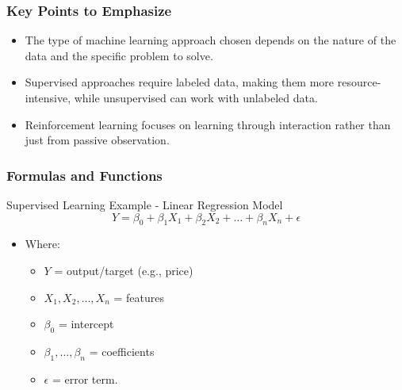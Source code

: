 \documentclass{beamer}
\begin{document}
\begin{frame}[fragile]
    \frametitle{Key Points to Emphasize}
    \begin{itemize}
        \item The type of machine learning approach chosen depends on the nature of the data and the specific problem to solve.
        \item Supervised approaches require labeled data, making them more resource-intensive, while unsupervised can work with unlabeled data.
        \item Reinforcement learning focuses on learning through interaction rather than just from passive observation.
    \end{itemize}
\end{frame}

\begin{frame}[fragile]
    \frametitle{Formulas and Functions}
    \begin{block}{Supervised Learning Example - Linear Regression Model}
        \begin{equation}
            Y = \beta_0 + \beta_1 X_1 + \beta_2 X_2 + \ldots + \beta_n X_n + \epsilon
        \end{equation}
    \end{block}
    \begin{itemize}
        \item Where:
            \begin{itemize}
                \item $Y$ = output/target (e.g., price)
                \item $X_1, X_2, \ldots, X_n$ = features
                \item $\beta_0$ = intercept
                \item $\beta_1, \ldots, \beta_n$ = coefficients
                \item $\epsilon$ = error term.
            \end{itemize}
    \end{itemize}
\end{frame}
\end{document}
